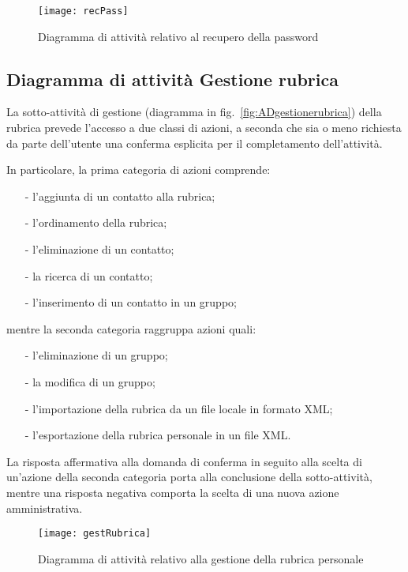 \begin{figure}[H]
  \centering
  \texttt{[image: recPass]}
  \caption{Diagramma di attività relativo al recupero della password}\label{fig:ADrecuperopassword}
\end{figure}

\subsection{Diagramma di attività Gestione rubrica}
La sotto-attività di gestione (diagramma in fig.~\vref{fig:ADgestionerubrica}) della rubrica prevede l'accesso a due classi di azioni, a seconda che sia o meno richiesta da parte dell'utente una conferma esplicita per il completamento dell'attività.

In particolare, la prima categoria di azioni comprende:
\begin{itemize}[noitemsep,nolistsep]
  \item[-] l'aggiunta di un contatto alla rubrica;
  \item[-] l'ordinamento della rubrica;
  \item[-] l'eliminazione di un contatto;
  \item[-] la ricerca di un contatto;
  \item[-] l'inserimento di un contatto in un gruppo;
\end{itemize}
mentre la seconda categoria raggruppa azioni quali:
\begin{itemize}[noitemsep,nolistsep]
  \item[-] l'eliminazione di un gruppo;
  \item[-] la modifica di un gruppo;
  \item[-] l'importazione della rubrica da un file locale in formato XML;
  \item[-] l'esportazione della rubrica personale in un file XML.
\end{itemize}

La risposta affermativa alla domanda di conferma in seguito alla scelta di un'azione della seconda categoria porta alla conclusione della sotto-attività, mentre una risposta negativa comporta la scelta di una nuova azione amministrativa.

\begin{figure}[H]
  \centering
  \texttt{[image: gestRubrica]}
  \caption{Diagramma di attività relativo alla gestione della rubrica personale}\label{fig:ADgestionerubrica}
\end{figure}

